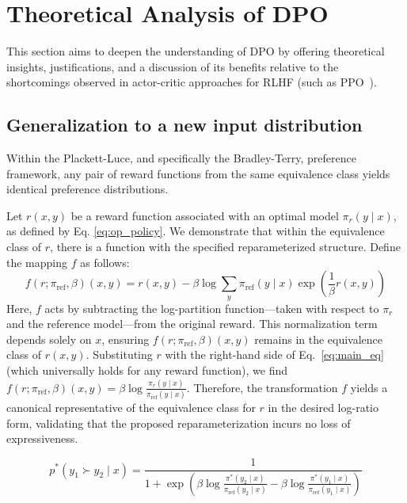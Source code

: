 \section{Theoretical Analysis of DPO} This section aims to deepen the understanding of DPO by offering theoretical insights, justifications, and a discussion of its benefits relative to the shortcomings observed in actor-critic approaches for RLHF (such as PPO~\cite{schulman2017proximal}).

\subsection{Generalization to a new input distribution}

\begin{lemma}\label{lemma:same_prefrence} Within the Plackett-Luce, and specifically the Bradley-Terry, preference framework, any pair of reward functions from the same equivalence class yields identical preference distributions.
\end{lemma}

\begin{sproof}
    Let $r(x, y)$ be a reward function associated with an optimal model $\pi_r(y \mid x)$, as defined by Eq. \ref{eq:op_policy}. We demonstrate that within the equivalence class of $r$, there is a function with the specified reparameterized structure. Define the mapping $f$ as follows:
\begin{equation}
    f(r; \pi_\text{ref}, \beta)(x, y) = r(x, y) - \beta\log\sum_{y}\pi_\text{ref}(y\mid x)\exp\left(\frac{1}{\beta}r(x, y)\right)
\end{equation}
Here, $f$ acts by subtracting the log-partition function—taken with respect to $\pi_r$ and the reference model—from the original reward. This normalization term depends solely on $x$, ensuring $f(r; \pi_\text{ref}, \beta)(x, y)$ remains in the equivalence class of $r(x, y)$. Substituting $r$ with the right-hand side of Eq.~\ref{eq:main_eq} (which universally holds for any reward function), we find $f(r; \pi_\text{ref}, \beta)(x, y) = \beta \log \frac{\pi_r(y\mid x)}{\pi_\text{ref}(y\mid x)}$. Therefore, the transformation $f$ yields a canonical representative of the equivalence class for $r$ in the desired log-ratio form, validating that the proposed reparameterization incurs no loss of expressiveness.
\end{sproof}

\begin{equation}\label{eq:objective}
    p^*(y_1\succ y_2 \mid x)=\frac{1}{1 + \exp\left(\beta \log \frac{\pi^*(y_2\mid x)}{\pi_\text{ref}(y_2\mid x)} - \beta \log \frac{\pi^*(y_1\mid x)}{\pi_\text{ref}(y_1\mid x)}\right)}
\end{equation}

